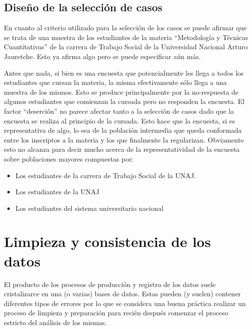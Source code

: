 \documentclass[
  letterpaper,
  DIV=11,
  numbers=noendperiod]{scrreprt}
\begin{document}
\hypertarget{diseuxf1o-de-la-selecciuxf3n-de-casos}{%
\section{Diseño de la selección de
casos}\label{diseuxf1o-de-la-selecciuxf3n-de-casos}}

En cuanto al criterio utilizado para la selección de los casos se puede
afirmar que se trata de una muestra de los estudiantes de la materia
``Metodología y Técnicas Cuantitativas'' de la carrera de Trabajo Social
de la Universidad Nacional Arturo Jauretche. Esto ya afirma algo pero se
puede especificar aún más.

Antes que nada, si bien es una encuesta que potencialmente les llega a
todos los estudiantes que cursan la materia, la misma efectivamente sólo
llega a una muestra de los mismos. Esto se produce principalmente por la
no-respuesta de algunos estudiantes que comienzan la cursada pero no
responden la encuesta. El factor ``deserción'' no parece afectar tanto a
la selección de casos dado que la encuesta se realiza al principio de la
cursada. Esto hace que la encuesta, si es representativa de algo, lo sea
de la población intermedia que queda conformada entre los inscriptos a
la materia y los que finalmente la regularizan. Obviamente esto no
alcanza para decir mucho acerca de la representatividad de la encuesta
sobre poblaciones mayores compuestas por:

\begin{itemize}
\item
  Los estudiantes de la carrera de Trabajo Social de la UNAJ.
\item
  Los estudiantes de la UNAJ
\item
  Los estudiantes del sistema universitario nacional
\end{itemize}


\hypertarget{cross}{%
\chapter{Limpieza y consistencia de los datos}\label{cross}}

El producto de los procesos de producción y registro de los datos suele
cristalizarce en una (o varias) bases de datos. Estas pueden (y suelen)
contener diferentes tipos de errores por lo que se considera una buena
práctica realizar un proceso de limpieza y preparación para recién
después comenzar el proceso estricto del análisis de los mismas.
\end{document}
